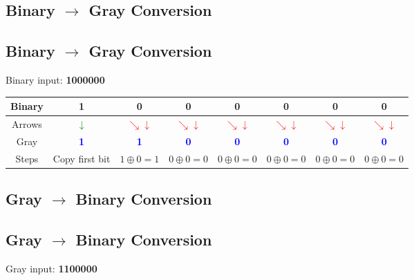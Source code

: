 \subsection*{Binary $\to$ Gray Conversion}
\subsection*{Binary $\to$ Gray Conversion}

Binary input: \textbf{ 1000000 }


\begin{tabular}{|c|*7{c|}}
\hline
Binary &  1 &  0 &  0 &  0 &  0 &  0 &  0   \\
\hline
Arrows &     \textcolor{green}{$\downarrow$}
&    \textcolor{red}{$\searrow\downarrow$}
&    \textcolor{red}{$\searrow\downarrow$}
&    \textcolor{red}{$\searrow\downarrow$}
&    \textcolor{red}{$\searrow\downarrow$}
&    \textcolor{red}{$\searrow\downarrow$}
&    \textcolor{red}{$\searrow\downarrow$}
 \\
\hline
Gray &   \textbf{\textcolor{blue}{ 1 }}
&  \textbf{\textcolor{blue}{ 1 }}
&  \textbf{\textcolor{blue}{ 0 }}
&  \textbf{\textcolor{blue}{ 0 }}
&  \textbf{\textcolor{blue}{ 0 }}
&  \textbf{\textcolor{blue}{ 0 }}
&  \textbf{\textcolor{blue}{ 0 }}
 \\
\hline
Steps &   {\small Copy first bit}
&  {\small $1 \oplus 0 = 1$}
&  {\small $0 \oplus 0 = 0$}
&  {\small $0 \oplus 0 = 0$}
&  {\small $0 \oplus 0 = 0$}
&  {\small $0 \oplus 0 = 0$}
&  {\small $0 \oplus 0 = 0$}
 \\
\hline
\end{tabular}


\bigskip

\subsection*{Gray $\to$ Binary Conversion}
\subsection*{Gray $\to$ Binary Conversion}

Gray input: \textbf{ 1100000 }


